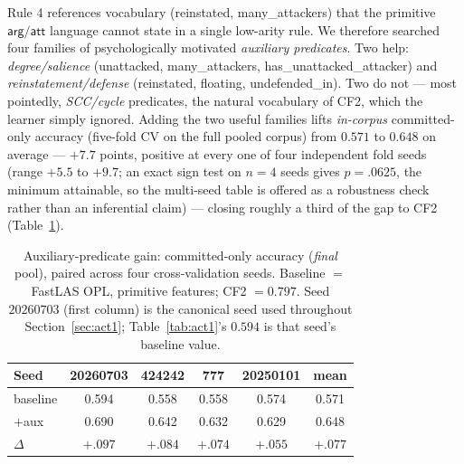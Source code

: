 \documentclass[review,12pt]{elsarticle}
\theoremstyle{definition}
\theoremstyle{remark}
\newcommand{\pred}[1]{\textsf{#1}}
\newcommand{\best}[1]{\textbf{#1}}
\begin{document}
Rule 4 references vocabulary (\pred{reinstated}, \pred{many\_attackers}) that
the primitive $\pred{arg}/\pred{att}$ language cannot state in a single
low-arity rule. We therefore searched four families of psychologically
motivated \emph{auxiliary predicates}. Two help: \emph{degree/salience}
(\pred{unattacked}, \pred{many\_attackers}, \pred{has\_unattacked\_attacker})
and \emph{reinstatement/defense} (\pred{reinstated}, \pred{floating},
\pred{undefended\_in}). Two do not --- most pointedly, \emph{SCC/cycle}
predicates, the natural vocabulary of CF2, which the learner simply ignored.
Adding the two useful families lifts \emph{in-corpus} committed-only
accuracy (five-fold CV on the full pooled corpus) from $0.571$ to
$0.648$ on average --- $+7.7$ points, positive at every one of four independent
fold seeds (range $+5.5$ to $+9.7$; an exact sign test on $n=4$ seeds gives
$p=.0625$, the minimum attainable, so the multi-seed table is offered as a
robustness check rather than an inferential claim) --- closing roughly a third
of the gap to CF2 (Table~\ref{tab:aux}).

\begin{table}[t]
\centering
\small
\caption{Auxiliary-predicate gain: committed-only accuracy (\emph{final} pool),
paired across four cross-validation seeds. Baseline $=$ FastLAS OPL, primitive
features; CF2 $= 0.797$. Seed $20260703$ (first column) is the canonical seed
used throughout Section~\ref{sec:act1}; Table~\ref{tab:act1}'s $0.594$ is that
seed's baseline value.}
\label{tab:aux}
\begin{tabular}{lccccc}
\toprule
Seed & 20260703 & 424242 & 777 & 20250101 & mean\\
\midrule
baseline & 0.594 & 0.558 & 0.558 & 0.574 & 0.571\\
$+$aux   & 0.690 & 0.642 & 0.632 & 0.629 & 0.648\\
\midrule
$\Delta$ & $+.097$ & $+.084$ & $+.074$ & $+.055$ & \best{$+.077$}\\
\bottomrule
\end{tabular}
\end{table}
\end{document}
